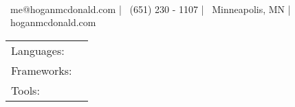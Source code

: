 \documentclass[]{awesome-cv}
\begin{document}
    
\begin{center}
	  \\
	\vspace{2mm}
	{\faEnvelope\ me@hoganmcdonald.com} | {\faMobile\ (651) 230 - 1107} | {\faMapMarker\ Minneapolis, MN} | {\faLink\ hoganmcdonald.com}
\end{center}
\begin{cventries}
	\cventry
	{}
	{\def\arraystretch{1.15}{\begin{tabular}{ l l }
		Languages:  & {\skill{ JavaScript, Python, Java, SQL}} \\
		Frameworks:  & {\skill{ React, AngularJs, React Native, Node.js, Express, PostgreSQL, MongoDB, TensorFlow, Keras, Numpy}} \\
		Tools:  & {\skill{ Git + Github, IntelliJ, PyCharm, Postman, GitLab}} \\
		\end{tabular}}}
	{}
	{}
	{}
\end{cventries}
\end{document}
